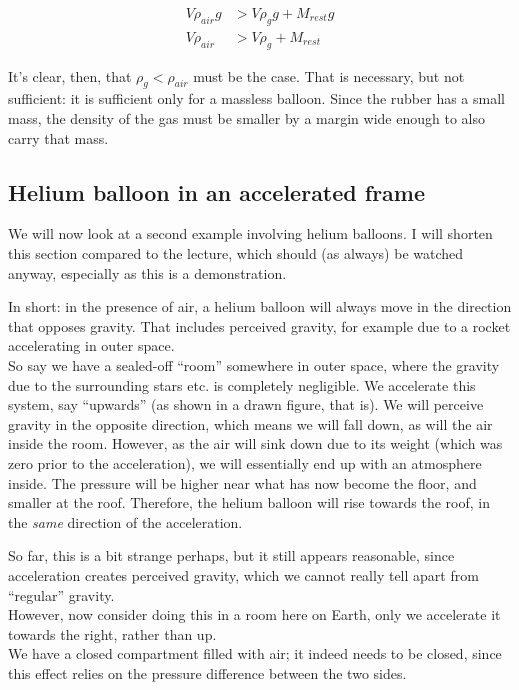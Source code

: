 \begin{align}
V \rho_{air} g &> V \rho_g g + M_{rest} g\\
V \rho_{air} &> V \rho_g + M_{rest}
\end{align}

It's clear, then, that $\rho_g < \rho_{air}$ must be the case. That is necessary, but not sufficient: it is sufficient only for a massless balloon. Since the rubber has a small mass, the density of the gas must be smaller by a margin wide enough to also carry that mass.

\subsection{Helium balloon in an accelerated frame}

We will now look at a second example involving helium balloons. I will shorten this section compared to the lecture, which should (as always) be watched anyway, especially as this is a demonstration.

In short: in the presence of air, a helium balloon will always move in the direction that opposes gravity. That includes perceived gravity, for example due to a rocket accelerating in outer space.\\
So say we have a sealed-off ``room'' somewhere in outer space, where the gravity due to the surrounding stars etc. is completely negligible. We accelerate this system, say ``upwards'' (as shown in a drawn figure, that is). We will perceive gravity in the opposite direction, which means we will fall down, as will the air inside the room. However, as the air will sink down due to its weight (which was zero prior to the acceleration), we will essentially end up with an atmosphere inside. The pressure will be higher near what has now become the floor, and smaller at the roof. Therefore, the helium balloon will rise towards the roof, in the \emph{same} direction of the acceleration.

So far, this is a bit strange perhaps, but it still appears reasonable, since acceleration creates perceived gravity, which we cannot really tell apart from ``regular'' gravity.\\
However, now consider doing this in a room here on Earth, only we accelerate it towards the right, rather than up.\\
We have a closed compartment filled with air; it indeed needs to be closed, since this effect relies on the pressure difference between the two sides.


